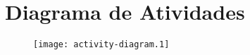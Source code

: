 \section{Diagrama de Atividades}
\begin{figure}[H]
    \centering
    \texttt{[image: activity-diagram.1]}
\end{figure}
